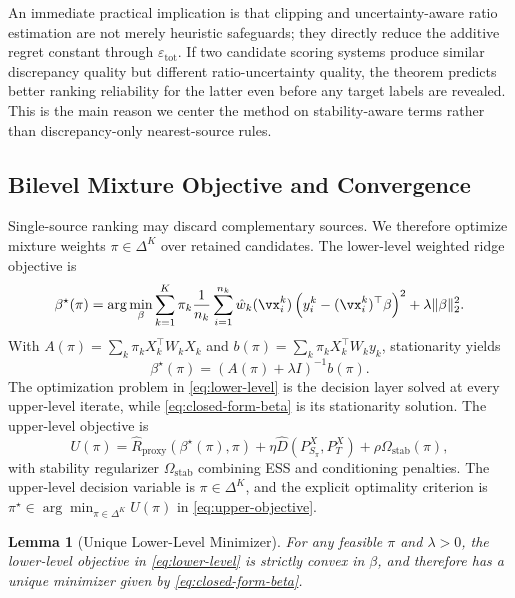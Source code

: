 \documentclass{article} %
\newtheorem{lemma}[theorem]{Lemma}
\begin{document}
An immediate practical implication is that clipping and uncertainty-aware ratio estimation are not merely heuristic safeguards; they directly reduce the additive regret constant through \(\varepsilon_{\mathrm{tot}}\). If two candidate scoring systems produce similar discrepancy quality but different ratio-uncertainty quality, the theorem predicts better ranking reliability for the latter even before any target labels are revealed. This is the main reason we center the method on stability-aware terms rather than discrepancy-only nearest-source rules.

\subsection{Bilevel Mixture Objective and Convergence}
Single-source ranking may discard complementary sources. We therefore optimize mixture weights \(\pi\in\Delta^K\) over retained candidates. The lower-level weighted ridge objective is
\begin{equation}
\beta^{\star}(\pi)=\arg\min_{\beta}\sum_{k=1}^{K}\pi_k\frac{1}{n_k}\sum_{i=1}^{n_k}\hat w_k(\vx_i^k)\left(y_i^k-(\vx_i^k)^\top\beta\right)^2+\lambda\|\beta\|_2^2.
\label{eq:lower-level}
\end{equation}
With
\(A(\pi)=\sum_k\pi_kX_k^\top W_kX_k\) and
\(b(\pi)=\sum_k\pi_kX_k^\top W_ky_k\), stationarity yields
\begin{equation}
\beta^{\star}(\pi)=\left(A(\pi)+\lambda I\right)^{-1}b(\pi).
\label{eq:closed-form-beta}
\end{equation}
The optimization problem in \eqref{eq:lower-level} is the decision layer solved at every upper-level iterate, while \eqref{eq:closed-form-beta} is its stationarity solution.
The upper-level objective is
\begin{equation}
U(\pi)=\widehat{R}_{\mathrm{proxy}}(\beta^{\star}(\pi),\pi)+\eta\widehat{D}(P_{S_\pi}^{X},P_T^{X})+\rho\Omega_{\mathrm{stab}}(\pi),
\label{eq:upper-objective}
\end{equation}
with stability regularizer \(\Omega_{\mathrm{stab}}\) combining ESS and conditioning penalties. The upper-level decision variable is \(\pi\in\Delta^K\), and the explicit optimality criterion is \(\pi^\star\in\arg\min_{\pi\in\Delta^K}U(\pi)\) in \eqref{eq:upper-objective}.

\begin{lemma}[Unique Lower-Level Minimizer]
\label{lem:lower-unique}
For any feasible \(\pi\) and \(\lambda>0\), the lower-level objective in \eqref{eq:lower-level} is strictly convex in \(\beta\), and therefore has a unique minimizer given by \eqref{eq:closed-form-beta}.
\end{lemma}
\end{document}
